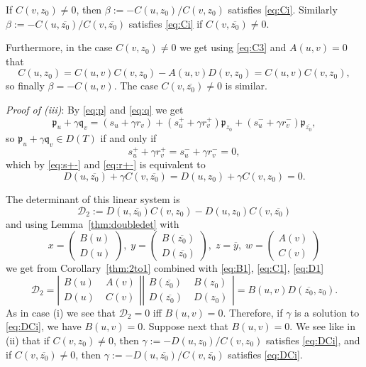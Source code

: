 \documentclass [12pt]{article}
\newcommand{\C}{\mathbb{C}}
\newcommand{\D}{\mathbb{D}}
\begin{document}
If $C(v,z_0)\neq 0$, then $\beta:=-C(u,z_0)/C(v,z_0)$ satisfies \eqref{eq:Ci}. Similarly $\beta:=-C(u,\overline{z_0})/C(v,\overline{z_0})$ satisfies \eqref{eq:Ci} if $C(v,\overline{z_0})\neq 0$.

Furthermore, in the case $C(v,z_0)\neq 0$ we get using \eqref{eq:C3} and $A(u,v)=0$ that
$$
C(u,z_0)=C(u,v)C(v,z_0)-A(u,v)D(v,z_0)=C(u,v)C(v,z_0),
$$
so finally $\beta=-C(u,v)$. The case $C(v,\overline{z_0})\neq 0$ is similar.

\medskip
{\it Proof of (iii)}: By \eqref{eq:p} and \eqref{eq:q} we get
$$
\mathfrak{p}_u+\gamma \mathfrak{q}_v=(s_u+\gamma r_v) + (s_u^+ +\gamma r_v^+)\mathfrak{p}_{z_0}+
(s_u^- +\gamma r_v^-)\mathfrak{p}_{\overline{z_0}},
$$
so $\mathfrak{p}_u+\gamma\mathfrak{q}_v\in D(T)$ if and only if 
$$
s_u^+ +\gamma r_v^+=s_u^- +\gamma r_v^-=0,
$$
which by \eqref{eq:s+-} and \eqref{eq:r+-} is equivalent to 
\begin{equation}\label{eq:DCi}
D(u,\overline{z_0})+\gamma C(v,\overline{z_0})=D(u,z_0)+\gamma C(v,z_0)=0.
\end{equation}

 The determinant of this linear system is 
\begin{equation*}\label{eq:det2}
{\mathcal D}_2:=D(u,\overline{z_0})C(v,z_0)-D(u,z_0)C(v,\overline{z_0})
\end{equation*}
and using Lemma~\ref{thm:doubledet} with
$$
x=\begin{pmatrix} B(u)\\D(u) \end{pmatrix},\; y=\begin{pmatrix}B(\overline{z_0})\\
D(\overline{z_0})\end{pmatrix},\; z=\overline{y},\;w=\begin{pmatrix} A(v)\\C(v)\end{pmatrix}
$$
we get from Corollary~\ref{thm:2to1} combined with \eqref{eq:B1}, \eqref{eq:C1}, \eqref{eq:D1}
$$
{\mathcal D}_2=\left|\begin{array}{cc}
 B(u)&\;A(v)\\D(u)&\;C(v)\end{array}\right|\left|\begin{array}{cc}
 B(\overline{z_0})&\;B(z_0)\\D(\overline{z_0})&\;D(z_0)\end{array}\right|
=B(u,v)D(\overline{z_0},z_0).
$$
As in case (i) we see that
${\mathcal D}_2=0$ iff $B(u,v)=0$.
Therefore, if $\gamma$ is a solution to \eqref{eq:DCi}, we have $B(u,v)=0$. Suppose next that $B(u,v)=0$. We see like in (ii) that if $C(v,z_0)\neq 0$, then $\gamma:=-D(u,z_0)/C(v,z_0)$ satisfies \eqref{eq:DCi}, and if $C(v,\overline{z_0})\neq 0$, then $\gamma:=-D(u,\overline{z_0})/C(v,\overline{z_0})$ satisfies \eqref{eq:DCi}.
\end{document}
